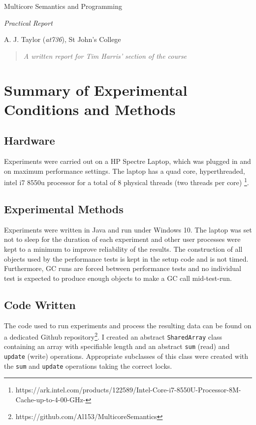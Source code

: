 \documentclass[11pt]{article}
\begin{document}
\centerline{\Large Multicore Semantics and Programming}
\vspace{2em}
\centerline{\Large \emph{Practical Report}}
\vspace{2em}
\centerline{\large A. J. Taylor (\emph{at736}), St John's College}
\vspace{1em}

\begin{abstract}
\textsl{
	A written report for Tim Harris' section of the course
} 
\end{abstract}




\section{Summary of Experimental Conditions and Methods}

\subsection{Hardware}
Experiments were carried out on a HP Spectre Laptop, which was plugged in and on maximum performance settings. The laptop has a quad core, hyperthreaded, intel i7 8550u processor for a total of 8 physical threads (two threads per core) \footnote{https://ark.intel.com/products/122589/Intel-Core-i7-8550U-Processor-8M-Cache-up-to-4-00-GHz-}.

\subsection{Experimental Methods}
Experiments were written in Java and run under Windows 10. The laptop was set not to sleep for the duration of each experiment and other user processes were kept to a minimum to improve reliability of the results. The construction of all objects used by the performance tests is kept in the setup code and is not timed. Furthermore, GC runs are forced between performance tests and no individual test is expected to produce enough objects to make a GC call mid-test-run.

\subsection{Code Written}
The code used to run experiments and process the resulting data can be found on a dedicated Github repository\footnote{https://github.com/Al153/MulticoreSemantics}. I created an abstract \texttt{SharedArray} class containing an array with specifiable length and an abstract \texttt{sum} (read) and \texttt{update} (write) operations. Appropriate subclasses of this class were created with the \texttt{sum} and \texttt{update} operations taking the correct locks.
\end{document}
